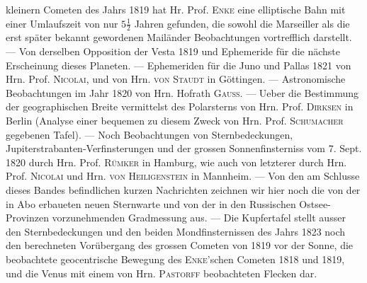 kleinern Cometen des Jahrs 1819 hat Hr. Prof. \textsc{Enke} eine elliptische Bahn mit einer Umlaufszeit von nur $5\tfrac{1}{2}$ Jahren gefunden, die sowohl die Marseiller als die erst später bekannt gewordenen Mailänder Beobachtungen vortrefflich darstellt. --- Von derselben Opposition der Vesta 1819 und Ephemeride für die nächste Erscheinung dieses Planeten. --- Ephemeriden für die Juno und Pallas 1821 von Hrn. Prof. \textsc{Nicolai}, und von Hrn. \textsc{von Staudt} in Göttingen. --- Astronomische Beobachtungen im Jahr 1820 von Hrn. Hofrath \textsc{Gauss}. --- Ueber die Bestimmung der geographischen Breite vermittelst des Polarsterns von Hrn. Prof. \textsc{Dirksen} in Berlin (Analyse einer bequemen zu diesem Zweck von Hrn. Prof. \textsc{Schumacher} gegebenen Tafel). --- Noch Beobachtungen von Sternbedeckungen, Jupiterstrabanten-Verfinsterungen und der grossen Sonnenfinsterniss vom 7. Sept. 1820 durch Hrn. Prof. \textsc{Rümker} in Hamburg, wie auch von letzterer durch Hrn. Prof. \textsc{Nicolai} und Hrn. \textsc{von Heiligenstein} in Mannheim. --- Von den am Schlusse dieses Bandes befindlichen kurzen Nachrichten zeichnen wir hier noch die von der in Abo erbaueten neuen Sternwarte und von der in den Russischen Ostsee-Provinzen vorzunehmenden Gradmessung aus. --- Die Kupfertafel stellt ausser den Sternbedeckungen und den beiden Mondfinsternissen des Jahrs 1823 noch den berechneten Vorübergang des grossen Cometen von 1819 vor der Sonne, die beobachtete geocentrische Bewegung des \textsc{Enke}'schen Cometen 1818 und 1819, und die Venus mit einem von Hrn. \textsc{Pastorff} beobachteten Flecken dar.
